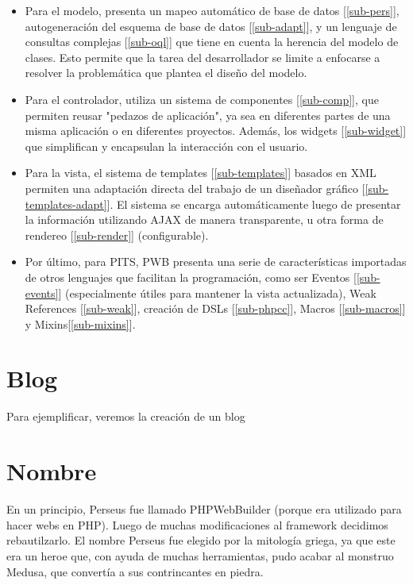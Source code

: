 \documentclass[a4paper,10pt]{article}
\begin{document}
\begin{itemize}
\item Para el modelo, presenta un mapeo automático de base de datos [\ref{sub-pers}], autogeneración del esquema de base de datos [\ref{sub-adapt}], y un lenguaje de consultas complejas [\ref{sub-oql}] que tiene en cuenta la herencia del modelo de clases.  Esto permite que la tarea del desarrollador se limite a enfocarse a resolver la problemática que plantea el diseño del modelo.

\item Para el controlador, utiliza un sistema de componentes [\ref{sub-comp}], que permiten reusar "pedazos de aplicación", ya sea en diferentes partes de una misma aplicación o en diferentes proyectos. Además, los widgets [\ref{sub-widget}] que simplifican y encapsulan la interacción con el usuario.

\item Para la vista, el sistema de templates [\ref{sub-templates}] basados en XML permiten una adaptación directa del
trabajo de un diseñador gráfico [\ref{sub-templates-adapt}]. El sistema se encarga automáticamente luego de presentar la información utilizando AJAX de manera transparente, u otra forma de rendereo [\ref{sub-render}] (configurable).

\item Por último, para PITS, PWB presenta una serie de características importadas de otros lenguajes que facilitan
la programación, como ser Eventos [\ref{sub-events}] (especialmente útiles para mantener la vista actualizada), Weak References [\ref{sub-weak}], creación de DSLs [\ref{sub-phpcc}], Macros [\ref{sub-macros}] y Mixins[\ref{sub-mixins}].
\end{itemize}

\section{Blog}
Para ejemplificar, veremos la creación de un blog


\section{Nombre}

En un principio, Perseus fue llamado PHPWebBuilder (porque era utilizado para hacer webs en PHP). Luego de muchas modificaciones al framework decidimos rebautilzarlo. El nombre Perseus fue elegido por la mitología griega, ya que este era un heroe que, con ayuda de muchas herramientas, pudo acabar al monstruo Medusa, que convertía a sus contrincantes en piedra.
\end{document}
